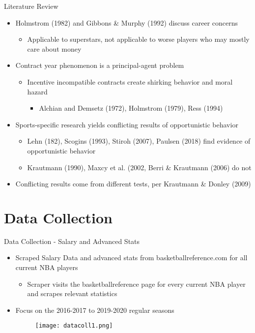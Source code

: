 \documentclass[12pt,aspectratio=916]{beamer} %
\begin{document}
\begin{frame}{Literature Review}
\begin{itemize}
	\item Holmstrom (1982) and Gibbons \& Murphy (1992) discuss career concerns
	\begin{itemize}
		\item Applicable to superstars, not applicable to worse players who may mostly care about money
	\end{itemize}	
	\item Contract year phenomenon is a principal-agent problem
	
	\begin{itemize}
		\item Incentive incompatible contracts create shirking behavior and moral hazard
		\begin{itemize}
			\item Alchian and Demsetz (1972), Holmstrom (1979), Ress (1994)
		\end{itemize}			
	\end{itemize}
	\item Sports-specific research yields conflicting results of opportunistic behavior
	\begin{itemize}
		\item Lehn (182), Scogins (1993), Stiroh (2007), Paulsen (2018) find evidence of opportunistic behavior
		\item Krautmann (1990), Maxcy et al. (2002, Berri \& Krautmann (2006) do not
	\end{itemize}
	\item Conflicting results come from different tests, per Krautmann \& Donley (2009)
\end{itemize}	
\end{frame}


\section{Data Collection}

\begin{frame}{Data Collection - Salary and Advanced Stats}
\begin{itemize}
\item Scraped Salary Data and advanced stats from basketballreference.com for all current NBA players
\begin{itemize}
	\item Scraper visits the basketballreference page for every current NBA player and scrapes relevant statistics
\end{itemize}
\item Focus on the 2016-2017 to 2019-2020 regular seasons
\begin{figure}
	\centering
	\texttt{[image: datacoll1.png]}
\end{figure}	
\end{itemize}
\end{frame}
\end{document}
